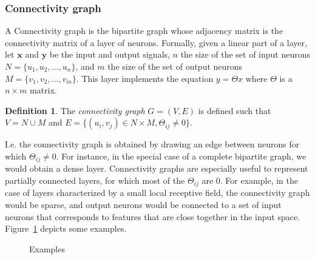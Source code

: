 \documentclass{article}
\theoremstyle{definition}
\newtheorem{definition}{Definition}[section]
\begin{document}
\subsubsection{Connectivity graph}
\label{con_graph}

A Connectivity graph is the bipartite graph whose adjacency matrix is the connectivity matrix of a layer of neurons.
Formally, given a linear part of a layer, let $\textbf{x}$ and $\textbf{y}$ be the input and output signals, $n$ the size of the set of input neurons $N = \{u_1, u_2, \ldots, u_n\}$, and $m$ the size of the set of output neurons $M = \{v_1, v_2, \ldots, v_m\}$. This layer implements the equation $y = \Theta x$ where $\Theta$ is a $n \times m$ matrix.

\begin{definition}
{The \emph{connectivity graph} $G = (V,E)$ is defined such that $V = N \cup M$ and $E = \{(u_i,v_j) \in  N \times M, \Theta_{ij} \neq 0 \} $.}
\end{definition}

I.e. the connectivity graph is obtained by drawing an edge between neurons for which $\Theta_{ij} \neq 0$.
For instance, in the special case of a complete bipartite graph, we would obtain a dense layer. 
Connectivity graphs are especially useful to represent partially connected layers, for which most of the $\Theta_{ij}$ are $0$. 
For example, in the case of layers characterized by a small local receptive field, the connectivity graph would be sparse, and output neurons would be connected to a set of input neurons that corresponds to features that are close together in the input space. Figure~\ref{con_ex} depicts some examples.

\begin{figure}[h]
  \begin{center}
  \end{center}
  \caption{Examples}
  \label{con_ex}
\end{figure}
\end{document}
